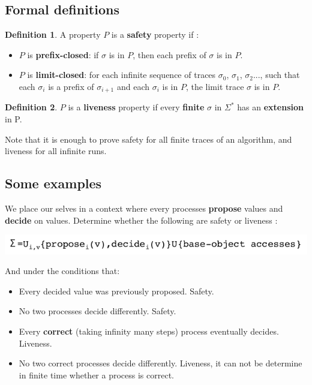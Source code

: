 \documentclass{article}
\theoremstyle{definition}
\newtheorem{definition}{Definition}[section]
\begin{document}
\subsection{Formal definitions}

\begin{definition}
A property $P$ is a \textbf{safety} property if :
\begin{itemize}
\item $P$ is \textbf{prefix-closed}: if $\sigma$ is in $P$, then each prefix of $\sigma$ is in $P$.
\item $P$ is \textbf{limit-closed}: for each infinite sequence of traces $\sigma_0$, $\sigma_1$, $\sigma_2$..., such that each $\sigma_i$ is a prefix of $\sigma_{i+1}$ and each $\sigma_i$ is in $P$, the limit trace $\sigma$ is in $P$. 
\end{itemize}
\end{definition}

\begin{definition}
$P$ is a \textbf{liveness} property if every \textbf{finite} $\sigma$ in $\Sigma^*$ has an \textbf{extension} in P.
\end{definition}

Note that it is enough to prove safety for all finite traces of an algorithm, and liveness for all infinite runs.

\subsection{Some examples}

We place our selves in a context where every processes \textbf{propose} values and \textbf{decide} on values. Determine whether the following are safety or liveness :
\begin{center}
\includegraphics[width=\textwidth]{values.png}
\end{center}
And under the conditions that:
\begin{itemize}
\item Every decided value was previously proposed.
Safety.
\item No two processes decide differently.
Safety.
\item Every \textbf{correct} (taking infinity many steps) process eventually decides.
Liveness.
\item No two correct processes decide differently.
Liveness, it can not be determine in finite time whether a process is correct.
\end{itemize}
\end{document}

